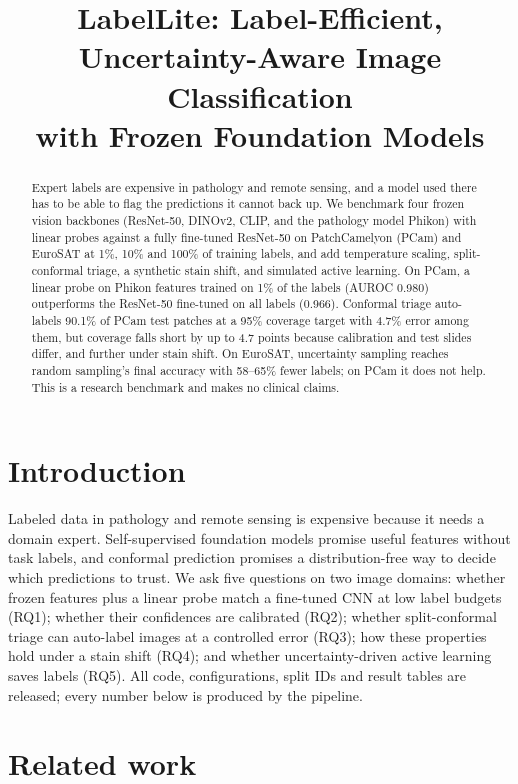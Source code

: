 \documentclass[10pt,twocolumn]{article}
\title{\vspace{-0.6in}\Large LabelLite: Label-Efficient, Uncertainty-Aware Image Classification\\
with Frozen Foundation Models}
\author{}
\date{}
\begin{document}
\maketitle
\vspace{-0.55in}

\begin{abstract}
\noindent
Expert labels are expensive in pathology and remote sensing, and a model used there has to be
able to flag the predictions it cannot back up. We benchmark four frozen vision backbones (ResNet-50, DINOv2, CLIP, and
the pathology model Phikon) with linear probes against a fully fine-tuned ResNet-50 on
PatchCamelyon (PCam) and EuroSAT at 1\%, 10\% and 100\% of training labels, and add temperature
scaling, split-conformal triage, a synthetic stain shift, and simulated active learning. On
PCam, a linear probe on Phikon features trained on 1\% of the labels (AUROC 0.980) outperforms
the ResNet-50 fine-tuned on all labels (0.966). Conformal triage auto-labels 90.1\% of PCam test
patches at a 95\% coverage target with 4.7\% error among them, but coverage falls short by up to
4.7 points because calibration and test slides differ, and further under stain shift. On
EuroSAT, uncertainty sampling reaches random sampling's final accuracy with 58--65\% fewer
labels; on PCam it does not help. This is a research benchmark and makes no clinical claims.
\end{abstract}

\section{Introduction}
Labeled data in pathology and remote sensing is expensive because it needs a domain expert.
Self-supervised foundation models promise useful features without task labels, and conformal
prediction promises a distribution-free way to decide which predictions to trust. We ask five
questions on two image domains: whether frozen features plus a linear probe match a fine-tuned
CNN at low label budgets (RQ1); whether their confidences are calibrated (RQ2); whether
split-conformal triage can auto-label images at a controlled error (RQ3); how these properties
hold under a stain shift (RQ4); and whether uncertainty-driven active learning saves labels
(RQ5). All code, configurations, split IDs and result tables are released; every number below
is produced by the pipeline.

\section{Related work}
\end{document}
